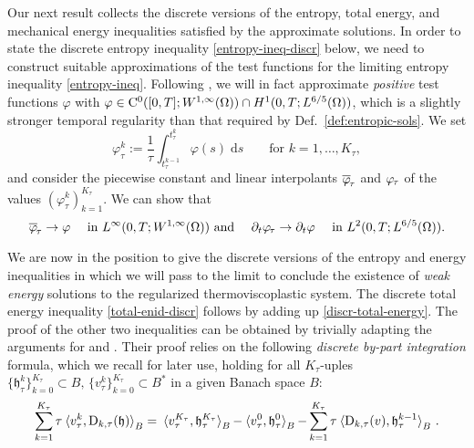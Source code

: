 \documentclass[a4paper,10pt,reqno]{amsart}
\numberwithin{equation}{section}
\numberwithin{equation}{section}
\def\dd{\;\!\mathrm{d}} %
\newcommand{\pairing}[4]{ \sideset{_{ #1 }}{_{ #2 }}  {\mathop{\langle #3 , #4
\rangle}}}
\newcommand{\piecewiseConstant}[2]{\overline{#1}_{\kern-1pt#2}}
\newcommand{\pwc}{\piecewiseConstant}
\newcommand{\piecewiseLinear}[2]{{#1}_{\kern-1pt#2}}
\newcommand{\pwl}{\piecewiseLinear}
\newcommand{\vtau}[1]{v_\tau^{#1}}
\newcommand{\btau}[1]{\mathfrak{h}_\tau^{#1}}
\newcommand{\dtau}[2]{\mathrm{D}_{#1,\tau}(#2)}
\newcommand{\Dtau}[2]{\mathrm{D}_{#1,\tau}(#2)}
\begin{document}
\par
Our next  result collects the discrete versions of the  entropy, total energy, and mechanical energy inequalities
satisfied by the approximate solutions. 
In order to state
 the discrete entropy inequality  \eqref{entropy-ineq-discr} below, 
 we need to 
 construct suitable approximations of the 
 test functions for the limiting  entropy inequality \eqref{entropy-ineq}. 
 Following \cite{Rossi2016}, we will in fact approximate \emph{positive}
 test functions $\varphi $ 
  with  $\varphi  \in {\mathrm C}^0 ([0,T]; W^{1,\infty}(\Omega)) \cap H^1 (0,T; L^{6/5}(\Omega)) $, which is 
   a slightly stronger  temporal regularity than that required by Def.\ \ref{def:entropic-sols}. 
   We set
     \begin{equation}
 \label{discrete-tests-phi}
   \varphi_\tau^k:= 
\frac{1}{\tau}\int_{t_\tau^{k-1}}^{t_\tau^k}  \varphi(s)\dd s \qquad \text{for } k=1, \ldots, K_\tau,
 \end{equation}
and consider the piecewise constant and  linear interpolants
$\pwc \varphi\tau$ and $\pwl \varphi\tau$ of the values
$(\varphi_\tau^k)_{k=1}^{K_\tau}$.
 We can show that 
\begin{equation}
\label{convergences-test-interpolants}
\pwc \varphi\tau  \to \varphi \quad
\text{ in } L^\infty (0,T; W^{1,\infty}(\Omega)) \text{ and }  \quad \partial_t \pwl \varphi\tau  \to \partial_t \varphi \quad \text{ in } L^2 (0,T; L^{6/5}(\Omega)).
\end{equation} 
\par
We are now in the position to give the discrete versions of the entropy and energy inequalities in which we will pass to the limit
to conclude the existence of \emph{weak energy} solutions to the regularized thermoviscoplastic system. 
The discrete total energy inequality \eqref{total-enid-discr} follows by adding up \eqref{discr-total-energy}. 
The proof of the other two inequalities can be obtained  %
by trivially adapting the arguments for \cite[Prop.\ 4.8]{Rocca-Rossi}  and \cite[Lemma 4.2]{Rossi2016}. 
Their proof relies on  the following  \emph{discrete by-part integration} formula,
which we recall for later use, 
 holding
for all $K_\tau$-uples  $\{\mathfrak{h}_\tau^k \}_{k=0}^{K_\tau} \subset B,\, \{ v_\tau^k \}_{k=0}^{K_\tau} \subset B^*$ in a given Banach space $B$:
\begin{equation}
\label{discr-by-part} \sum_{k=1}^{K_\tau} \tau
\pairing{}{B}{\vtau{k}}{\Dtau{k}{\mathfrak{h}}} =
\pairing{}{B}{\vtau{K_\tau}}{\btau{K_\tau}}
-\pairing{}{B}{\vtau{0}}{\btau{0}} -\sum_{k=1}^{K_\tau}\tau\pairing{}{B}{\dtau{k}{v} }{ \btau{k-1}}\,.
\end{equation}
\end{document}
